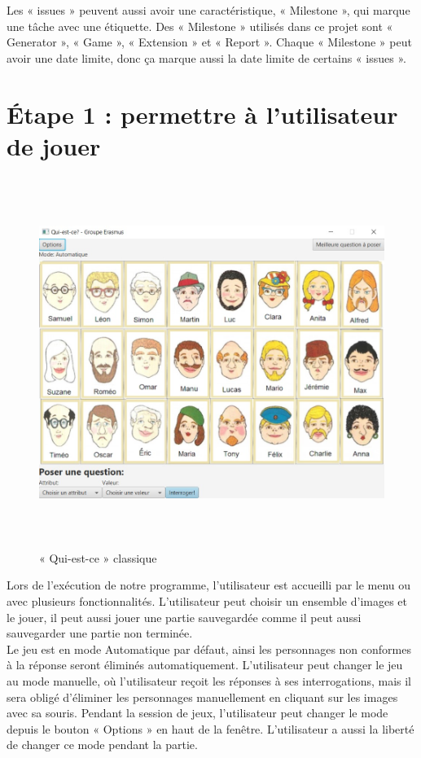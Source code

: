 \documentclass[a4paper]{article}
\begin{document}
Les « issues » peuvent aussi avoir une caractéristique, « Milestone », qui marque une tâche avec une étiquette. Des « Milestone » utilisés dans ce projet sont « Generator », « Game », « Extension » et « Report ». Chaque « Milestone » peut avoir une date limite, donc ça marque aussi la date limite de certains « issues ».
\newpage

\section{Étape 1 : permettre à l'utilisateur de jouer}


\begin{figure}[h!] 
  \includegraphics[width = 16cm, height=12cm]{normal game.jpg}
  \caption{« Qui-est-ce » classique}
\end{figure}


Lors de l’exécution de notre programme, l’utilisateur est accueilli par le menu ou avec plusieurs fonctionnalités. L’utilisateur peut choisir un ensemble d’images et le jouer, il peut aussi jouer une partie sauvegardée comme il peut aussi sauvegarder une partie non terminée.\\
Le jeu est en mode Automatique par défaut, ainsi les personnages non conformes à la réponse seront éliminés automatiquement. L’utilisateur peut changer le jeu au mode manuelle, où l’utilisateur reçoit les réponses à ses interrogations, mais il sera obligé d'éliminer les personnages manuellement en cliquant sur les images avec sa souris. Pendant la session de jeux, l’utilisateur peut changer le mode depuis le bouton « Options » en haut de la fenêtre. L’utilisateur a aussi la liberté de changer ce mode pendant la partie.\\
\end{document}
